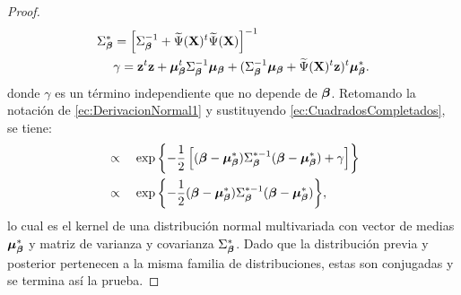 \documentclass[../../Main/Main.tex]{subfiles}
\begin{document}
\begin{proof}
\begin{align}
	 \Sigma_{\bm{\beta}}^* &= \left[\Sigma_{\bm{\beta}}^{-1} + \widetilde{\Psi}(\mathbf{X})^t\widetilde{\Psi}(\mathbf{X})\right]^{-1}\nonumber \\
	 & \gamma = \mathbf{z}^t\mathbf{z} + \bm{\mu}_{\bm{\beta}}^t\Sigma_{\bm{\beta}}^{-1}\bm{\mu}_{\bm{\beta}} + (\Sigma_{\bm{\beta}}^{-1}\bm{\mu}_{\bm{\beta}} + \widetilde{\Psi}(\mathbf{X})^t\mathbf{z})^t\bm{\mu}_{\bm{\beta}}^* \nonumber.
\end{align}
donde $\gamma$ es un término independiente que no depende de $\bm{\beta}$. Retomando la notación de \eqref{ec:DerivacionNormal1} y sustituyendo \eqref{ec:CuadradosCompletados}, se tiene:
\begin{align*}
&\propto \quad \exp{\left\{ -\dfrac{1}{2} \left[ (\bm{\beta}- \bm{\mu}_{\bm{\beta}}^*)\Sigma_{\bm{\beta}}^{*-1}(\bm{\beta}- \bm{\mu}_{\bm{\beta}}^*) + \gamma \right]\right\}} \nonumber \\
&\propto \quad \exp{\left\{ -\dfrac{1}{2}  (\bm{\beta}- \bm{\mu}_{\bm{\beta}}^*)\Sigma_{\bm{\beta}}^{*-1}(\bm{\beta}- \bm{\mu}_{\bm{\beta}}^*)\right\}},
\end{align*}
lo cual es el kernel de una distribución normal multivariada con vector de medias $\bm{\mu}_{\bm{\beta}}^*$ y matriz de varianza y covarianza $\Sigma_{\bm{\beta}}^*$. Dado que la distribución previa y posterior pertenecen a la misma familia de distribuciones, estas son conjugadas y se termina así la prueba. 
\end{proof}
\end{document}
